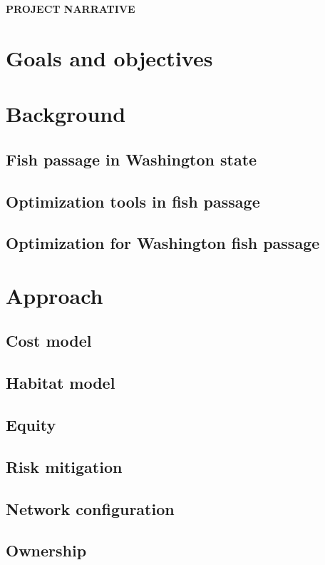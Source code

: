 \documentclass[12pt]{elsarticle}
\begin{document}
\begin{center} \textbf{PROJECT NARRATIVE} \end{center}

%
\section{Goals and objectives}


%
\section{Background}
\subsection{Fish passage in Washington state}
\subsection{Optimization tools in fish passage}
\subsection{Optimization for Washington fish passage}

%
\section{Approach}
\subsection{Cost model}
\subsection{Habitat model}
\subsection{Equity}
\subsection{Risk mitigation}

\subsection{Network configuration}
\subsection{Ownership}
\end{document}
